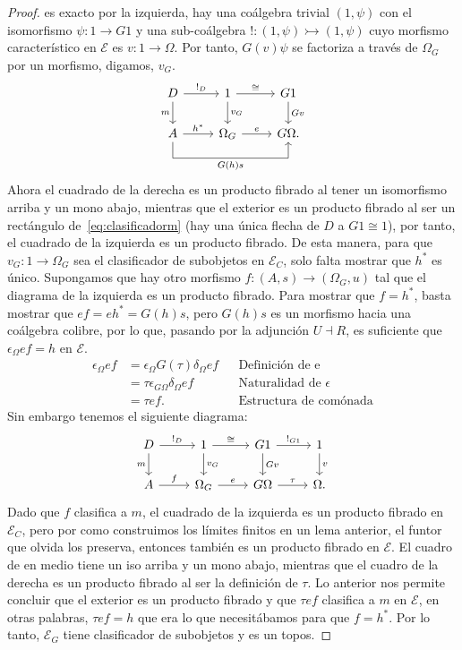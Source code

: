 \begin{proof}
  es exacto por la izquierda, hay una coálgebra trivial $(1,\psi)$ con el isomorfismo $\psi\colon 1\to G1$ y
  una sub-coálgebra $!\colon (1,\psi)\rightarrowtail (1,\psi)$ cuyo morfismo característico en $\mathcal{E}$ es $v\colon 1\to \Omega$.
  Por tanto, $G(v)\psi$ se factoriza a través de $\Omega_G$ por un morfismo, digamos, $v_G$.
  \begin{equation*}
    \begin{tikzcd}
      D\ar{r}{!_D}\ar[swap]{d}{m} & 1\ar{r}{\cong}\ar{d}{v_G} & G1\ar{d}{Gv} \\
      A\ar{r}{h^*}\ar[to path = { -- ([yshift=-3ex]\tikztostart.south) -| (\tikztotarget.south)\tikztonodes}]{rr}[swap,pos=0.25]{G(h)s}
      & \Omega_G\ar{r}{e} & G\Omega.
    \end{tikzcd}
  \end{equation*}
Ahora el cuadrado de la derecha es un producto fibrado al tener un isomorfismo arriba y un mono abajo,
mientras que el exterior es un producto fibrado al ser un rectángulo de~\eqref{eq:clasificadorm} (hay una única
flecha de $D$ a $G1\cong 1$), por tanto, el cuadrado de la izquierda es un producto fibrado. De esta manera,
para que $v_G\colon 1\to \Omega_G$ sea el clasificador de subobjetos en $\mathcal{E}_C$, solo falta mostrar que
$h^*$ es único. Supongamos que hay otro morfismo $f\colon (A,s)\to (\Omega_G,u)$ tal que el diagrama de la izquierda
es un producto fibrado. Para mostrar que $f=h^*$, basta mostrar que $ef=eh^*=G(h)s$, pero $G(h)s$ es un morfismo
hacia una coálgebra colibre, por lo que, pasando por la adjunción $U\dashv R$, es suficiente que
$\epsilon_{\Omega}ef=h$ en $\mathcal{E}$.
\begin{align*}
  \epsilon_{\Omega}ef &= \epsilon_{\Omega}G(\tau)\delta_{\Omega}ef && \text{Definición de e} \\
  &= \tau\epsilon_{G\Omega}\delta_{\Omega}ef && \text{Naturalidad de $\epsilon$} \\
  &= \tau ef. && \text{Estructura de comónada}
\end{align*}
Sin embargo tenemos el siguiente diagrama:
\begin{equation*}
  \begin{tikzcd}
    D\ar{r}{!_D}\ar[swap]{d}{m} & 1\ar{r}{\cong}\ar{d}{v_G} & G1\ar{r}{!_{G1}}\ar{d}{Gv} & 1\ar{d}{v} \\
    A\ar{r}{f} & \Omega_G\ar{r}{e} & G\Omega\ar{r}{\tau} & \Omega.
  \end{tikzcd}
\end{equation*}
Dado que $f$ clasifica a $m$, el cuadrado de la izquierda es un producto fibrado en $\mathcal{E}_C$, pero por
como construimos los límites finitos en un lema anterior, el funtor que olvida los preserva, entonces también es un
producto fibrado en $\mathcal{E}$. El cuadro de en medio tiene un iso arriba y un mono abajo, mientras que el cuadro
de la derecha es un producto fibrado al ser la definición de $\tau$. Lo anterior nos permite concluir que el exterior
es un producto fibrado y que $\tau ef$ clasifica a $m$ en $\mathcal{E}$, en otras palabras, $\tau ef = h$ que era
lo que necesitábamos para que $f=h^*$. Por lo tanto, $\mathcal{E}_G$ tiene clasificador de subobjetos y es un topos.
\end{proof}

